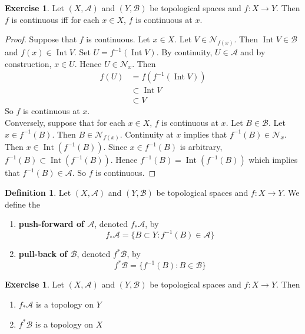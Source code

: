 \documentclass[12pt]{amsart}
\theoremstyle{definition}
\newtheorem{defn}[definition]{Definition}
\newtheorem{ex}[definition]{Exercise}
\newcommand{\MA}{\mathcal{A}}
\newcommand{\MB}{\mathcal{B}}
\newcommand{\MN}{\mathcal{N}}
\newcommand{\tbf}[1]{\textbf{#1}}
\DeclareMathOperator{\Int}{Int}
\DeclareMathOperator*{\0}{\mbf{0}}
\DeclareMathOperator*{\1}{\mbf{1}}
\newcommand{\lex}[1]{\label{ex:#1}}
\newcommand{\ld}[1]{\label{defn:#1}}
\begin{document}
	\begin{ex} \lex{}
	Let $(X,\MA)$ and $(Y,\MB)$ be topological spaces and $f:X \rightarrow Y$. Then $f$ is continuous iff for each $x \in X$, $f$ is continuous at $x$.
	\end{ex}
	
	\begin{proof}
	Suppose that $f$ is continuous. Let $x \in X$. Let $V \in \MN_{f(x)}$. Then $\Int V \in \MB$ and $f(x) \in \Int V$. Set $U = f^{-1}(\Int V)$. By continuity, $U \in \MA$ and by construction, $x \in U$. Hence $U \in \MN_x$. Then 
	\begin{align*}
	f(U)
	&= f(f^{-1}(\Int V))\\
	& \subset \Int V\\
	& \subset V
\end{align*}	 	
So $f$ is continuous at $x$. \\
Conversely, suppose that for each $x \in X$, $f$ is continuous at $x$. Let $B \in \MB$. Let $x \in f^{-1}(B)$. Then $B \in \MN_{f(x)}$. Continuity at $x$ implies that $f^{-1}(B) \in \MN_x$. Then $x \in \Int (f^{-1}(B))$. Since $x \in f^{-1}(B)$ is arbitrary, $f^{-1}(B) \subset \Int (f^{-1}(B))$. Hence $f^{-1}(B) = \Int (f^{-1}(B))$ which implies that $f^{-1}(B) \in \MA$. So $f$ is continuous.
	\end{proof}
	
	\begin{defn} \ld{}
	Let $(X, \MA)$ and $(Y,\MB)$ be topological spaces and $f: X \rightarrow Y$. We define the 
	\begin{enumerate}
	\item \tbf{push-forward of $\MA$}, denoted $f_*\MA$, by 
	$$f_*\MA = \{B \subset Y: f^{-1}(B) \in \MA\}$$ 
	\item  \tbf{pull-back of $\MB$}, denoted $f^*\MB$, by  
	$$f^*\MB = \{f^{-1}(B):  B \in \MB \}$$
	\end{enumerate}
	\end{defn}
	
	\begin{ex} \lex{} 
		Let $(X,\MA)$ and $(Y,\MB)$ be topological spaces and $f: X \rightarrow Y$. Then 
		\begin{enumerate}
			\item $f_*\MA$ is a topology on $Y$
			\item $f^*\MB$ is a topology on $X$
		\end{enumerate}
	\end{ex}
	
\end{document}
